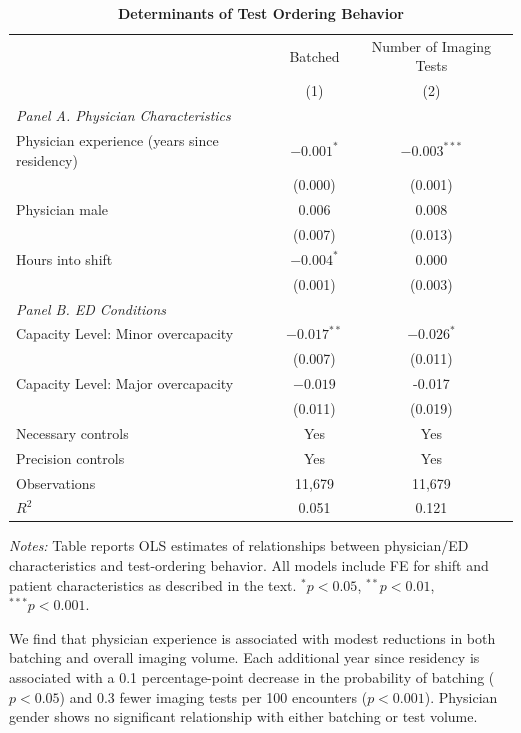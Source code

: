 \documentclass[,,blindrev]{informs}
\begin{document}
\begin{table}[t!]
\centering
\caption{\textbf{Determinants of Test Ordering Behavior}}
\label{tab:determinants}
\begin{threeparttable}
\begin{tabular}{p{7.5cm}cc}
\toprule
& Batched & Number of Imaging Tests \\
& (1) & (2) \\ 
\midrule

\multicolumn{3}{l}{\textit{Panel A. Physician Characteristics}} \\[0.5em]

Physician experience (years since residency)
    & $-0.001^{*}$ 
    & $-0.003^{***}$ \\
& (0.000) 
& (0.001) \\[0.75em]
Physician male 
    & 0.006 
    & 0.008 \\
& (0.007) 
& (0.013) \\[0.75em]
Hours into shift 
    & $-0.004^{*}$ 
    & 0.000 \\
& (0.001) 
& (0.003) \\[0.75em]
\multicolumn{3}{l}{\textit{Panel B. ED Conditions}} \\[0.5em]
Capacity Level: Minor overcapacity 
    & $-0.017^{**}$ 
    & $-0.026^{*}$ \\
& (0.007) 
& (0.011) \\[0.75em]
Capacity Level: Major overcapacity 
    & $-0.019$ 
    & -0.017 \\
& (0.011) 
& (0.019) \\[0.75em]
\midrule
Necessary controls & Yes & Yes \\
Precision controls & Yes & Yes \\
Observations & 11{,}679 & 11{,}679 \\
$R^2$ & 0.051 & 0.121 \\
\bottomrule
\end{tabular}
\begin{flushleft}
\footnotesize
\textit{Notes:} Table reports OLS estimates of relationships between physician/ED characteristics and test-ordering behavior. 
All models include FE for shift and patient characteristics as described in the text.
$^{*}p<0.05$, $^{**}p<0.01$, $^{***}p<0.001$.
\end{flushleft}
\end{threeparttable}
\end{table}

We find that physician experience is associated with modest reductions
in both batching and overall imaging volume. Each additional year since
residency is associated with a 0.1 percentage-point decrease in the
probability of batching (\(p<0.05\)) and 0.3 fewer imaging tests per 100
encounters (\(p<0.001\)). Physician gender shows no significant
relationship with either batching or test volume.
\end{document}
